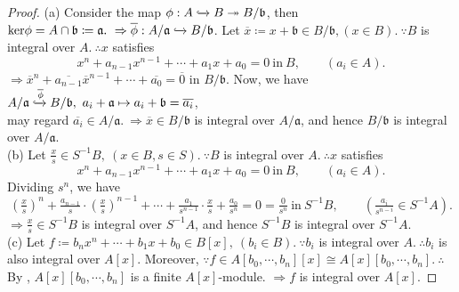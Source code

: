 \documentclass[12pt,a4paper,footinclude=true,headinclude=true]{scrbook} %
\begin{document}
\begin{proof}
    (a) Consider the map $\phi:A\xhookrightarrow{} B\twoheadrightarrow B/\mathfrak{b}$, then $\mathrm{ker}\phi=A\cap\mathfrak{b}\coloneqq \mathfrak{a}.\ \Rightarrow\overline{\phi}:A/\mathfrak{a} \xhookrightarrow{} B/\mathfrak{b}$. Let $\overline{x}\coloneqq x+\mathfrak{b}\in B/\mathfrak{b}, (x\in B).\ \because B$ is integral over $A.\ \therefore x$ satisfies 
    \begin{equation*}
        x^n+a_{n-1}x^{n-1}+\cdots+a_1x+a_0=0\ \text{in}\ B,\qquad (a_i\in A).
    \end{equation*}
    $\Rightarrow \overline{x}^n+\overline{a_{n-1}}\overline{x}^{n-1}+\cdots+ \overline{a_0}=\overline{0}$ in $B/\mathfrak{b}$. Now, we have $A/\mathfrak{a} \xhookrightarrow{\overline{\phi}} B/\mathfrak{b},\ a_i+\mathfrak{a}\mapsto a_i+\mathfrak{b}=\overline{a_i}$,\\ may regard $\overline{a_i}\in A/\mathfrak{a}.\ \Rightarrow \overline{x}\in B/\mathfrak{b}$ is integral over $A/\mathfrak{a}$, and hence $B/\mathfrak{b}$ is integral over $A/\mathfrak{a}$. \\ 
    (b) Let $\frac{x}{s}\in S^{-1}B,\ (x\in B,s\in S).\ \because B$ is integral over $A.\ \therefore x$ satisfies 
    \begin{equation*}
        x^n+a_{n-1}x^{n-1}+\cdots+a_1x+a_0=0\ \text{in}\ B,\qquad (a_i\in A).
    \end{equation*}
    Dividing $s^n$, we have 
    \begin{equation*}
        (\tfrac{x}{s})^n+\tfrac{a_{n-1}}{s}\cdot(\tfrac{x}{s})^{n-1}+\cdots +\tfrac{a_1}{s^{n-1}}\cdot\tfrac{x}{s}+\tfrac{a_0}{s^n}=0=\tfrac{0}{s^n}\ \text{in}\ S^{-1}B,\qquad (\tfrac{a_i}{s^{n-i}}\in S^{-1}A).
    \end{equation*}
    $\Rightarrow \frac{x}{s}\in S^{-1}B$ is integral over $S^{-1}A$, and hence $S^{-1}B$ is integral over $S^{-1}A$.\\
    (c) Let $f\coloneqq b_nx^n+\cdots+b_1x+b_0\in B[x],\ (b_i\in B).\ \because b_i$ is integral over $A.\ \therefore b_i$ is also integral over $A[x]$.  Moreover, $\because f\in A[b_0,\cdots,b_n][x]\cong A[x][b_0,\cdots,b_n].\ \therefore$ By , $A[x][b_0,\cdots,b_n]$ is a finite $A[x]$-module. $\Rightarrow f$ is integral over $A[x]$.  
\end{proof}
\end{document}
